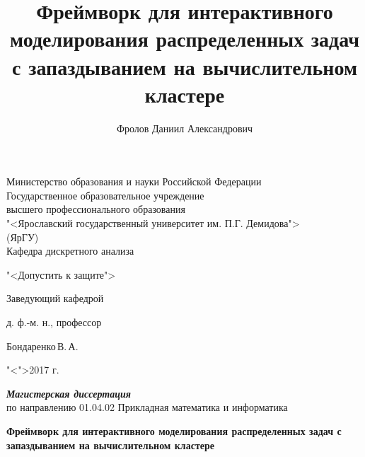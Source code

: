 \documentclass[a4paper, 14pt]{extarticle}
\title{Фреймворк для интерактивного моделирования распределенных задач с запаздыванием на вычислительном кластере}
\author{Фролов Даниил Александрович}
\theoremstyle{definition}
\begin{document}
\setcounter{tocdepth}{3}

\makeatletter
\AtEndDocument{%
	\addtocounter{totfigures}{\value{figure}}%
	\addtocounter{tottables}{\value{table}}%
	\addtocounter{totsections}{\value{section}}%
	\immediate\write\@mainaux{%
		\string\gdef\string\totfig{\number\value{totfigures}}%
		\string\gdef\string\tottab{\number\value{tottables}}%
		\string\gdef\string\totsections{\number\value{totsections}}%
	}%
}
\makeatother


{
\thispagestyle{empty}

\begin{center}
	
	Министерство образования и науки Российской Федерации\\[0.3cm]
	Государственное образовательное учреждение\\
	высшего профессионального образования\\
	"<Ярославский государственный университет им. П.Г. Демидова">\\
	(ЯрГУ)\\[0.3cm]
	
	Кафедра дискретного анализа
	
	\bigskip
	
	\hspace{15em}"<Допустить к защите">
	
	\begin{flushright}
		Заведующий кафедрой\par
		д. ф.-м. н., профессор\par
		\underline{\hspace{3.2cm}}Бондаренко\,В.\,А.\par
		"<\underline{\hspace{0.5cm}}">\underline{\hspace{3.4cm}}2017 г.\par
	\end{flushright}
	
	\bigskip
	
	{\textbf
		{\textit
			{Магистерская диссертация}
		}
	}
	\\
	по направлению 01.04.02 Прикладная математика и информатика
	
	\bigskip
	
	{\bf
		Фреймворк для интерактивного моделирования распределенных задач с запаздыванием на вычислительном кластере 
	}
\end{center}

}
\end{document}
